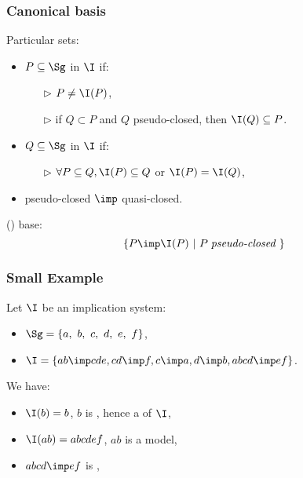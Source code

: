 \begin{frame}
\frametitle{Canonical basis}

Particular sets:
\begin{itemize}
	\item $P \subseteq \Sg$  in $\I$ if:
		\begin{itemize}
			\item[\color{belize} $\triangleright$] $P \neq \I(P)$,
			\item[\color{belize} $\triangleright$] if $Q \subset P$ and $Q$ pseudo-closed, then $\I(Q) \subseteq P$.
		\end{itemize}
	\item $Q \subseteq \Sg$  in $\I$ if:
		\begin{itemize}
			\item[\color{belize} $\triangleright$] $\forall P \subseteq Q, \I(P) \subseteq Q$ or $\I(P) = \I(Q)$,
		\end{itemize}
	\item pseudo-closed $\imp$ quasi-closed.
\end{itemize} 

\vspace{1.2em}

 () base:
\[ \{ P \imp \I(P) \ | \ P \; \textit{pseudo-closed } \} \]


\end{frame}


\begin{frame}
\frametitle{Small Example}

Let $\I$ be an implication system:
\begin{itemize}
	\item $\Sg = \{ a, \ b, \ c, \ d, \ e, \ f \}$,
	\item $\I = \{ ab \imp cde, cd \imp f, c \imp a, d \imp b, abcd \imp ef \}$.
\end{itemize}

\vspace{1.2em}

We have:
\begin{itemize}
	\item $\I(b) = b$, $b$ is , hence a  of $\I$,
	\item $\I(ab) = abcdef$, $ab$ is  a model, \quad 
	\item $abcd \imp ef$ is ,
\end{itemize}

\end{frame}
